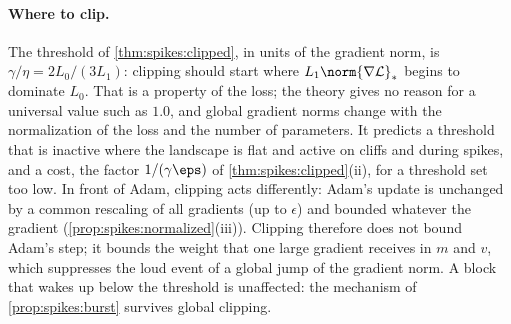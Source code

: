 \begin{refsection}
\paragraph{Where to clip.} The threshold of \cref{thm:spikes:clipped}, in units of the gradient norm, is $\gamma/\eta=2L_0/(3L_1)$: clipping should start where $L_1\norm{\nabla\Loss}_*$ begins to dominate $L_0$. That is a property of the loss; the theory gives no reason for a universal value such as $1.0$, and global gradient norms change with the normalization of the loss and the number of parameters. It predicts a threshold that is inactive where the landscape is flat and active on cliffs and during spikes, and a cost, the factor $1/(\gamma\eps)$ of \cref{thm:spikes:clipped}(ii), for a threshold set too low. In front of Adam, clipping acts differently: Adam's update is unchanged by a common rescaling of all gradients (up to $\epsilon$) and bounded whatever the gradient (\cref{prop:spikes:normalized}(iii)). Clipping therefore does not bound Adam's step; it bounds the weight that one large gradient receives in $m$ and $v$, which suppresses the loud event of a global jump of the gradient norm. A block that wakes up below the threshold is unaffected: the mechanism of \cref{prop:spikes:burst} survives global clipping.


\end{refsection}
